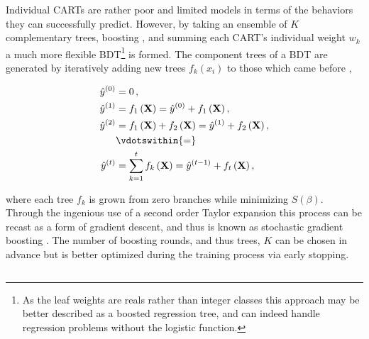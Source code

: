Individual CARTs are rather poor and limited models
in terms of the behaviors they can successfully predict.
However, by taking an ensemble of $K$ complementary trees, \ie boosting \cite{FREUND1997119,friedman2000},
and summing each CART's individual weight $w_{k}$ a much more flexible BDT\footnote{As the leaf weights
are reals rather than integer classes this approach may be better described as a boosted regression tree,
and can indeed handle regression problems without the logistic function.} is formed.
The component trees of a BDT are generated by iteratively adding new trees $f_{k}\left(x_{i}\right)$ to those which came before \cite{XGBoost},

\begin{equation} \label{eq:boosting}
\begin{aligned}
\hat{y}^{\left(0\right)} &= 0\,, \\
\hat{y}^{\left(1\right)} &= f_1\left(\mathbf{X}\right) = \hat{y}^{\left(0\right)} + f_1\left(\mathbf{X}\right), \\
\hat{y}^{\left(2\right)} &= f_1\left(\mathbf{X}\right) + f_2\left(\mathbf{X}\right)= \hat{y}^{\left(1\right)} + f_2\left(\mathbf{X}\right), \\
                           &\vdotswithin{\displaystyle =} \\
\hat{y}^{\left(t\right)} &= \sum_{k=1}^t f_k\left(\mathbf{X}\right)= \hat{y}^{\left(t-1\right)} + f_t\left(\mathbf{X}\right),
\end{aligned}
\end{equation}

\noindent where each tree $f_{k}$ is grown from zero branches while minimizing $S\left(\beta\right)$.
Through the ingenious use of a second order Taylor expansion this process can
be recast as a form of gradient descent, and thus is known as
stochastic gradient boosting \cite{10.2307/2699986,FRIEDMAN2002367}.
The number of boosting rounds, and thus trees, $K$ can be chosen in advance
but is better optimized during the training process via early stopping.

\subsection{\xgboost}%
\label{ml:supervised:BDT:xgboost}

